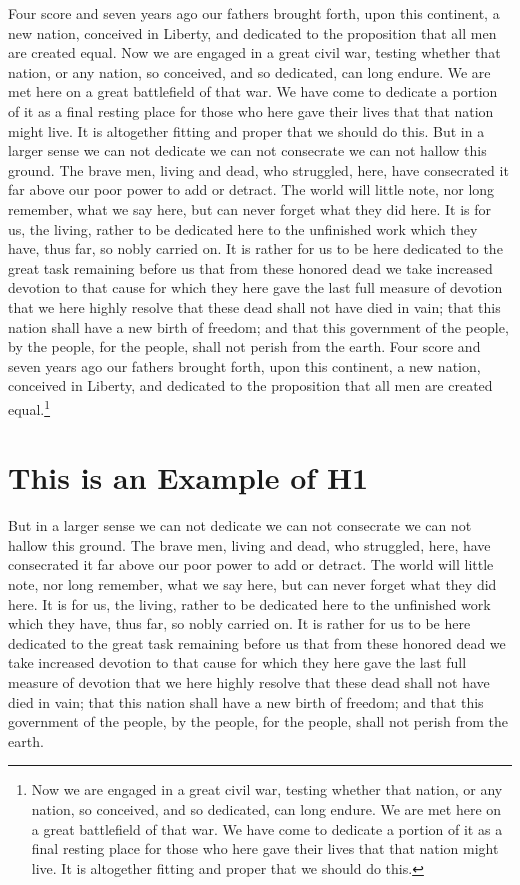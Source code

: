 \documentclass{roffin}
\begin{document}
Four score and seven years ago our fathers brought forth,
upon this continent, a new nation, conceived in Liberty, and dedicated to
the proposition that all men are created equal.
Now we are engaged in a great civil war, testing whether that nation, or any nation, so conceived, and so dedicated, can long endure.
We are met here on a great battlefield of that war. We have come to dedicate a portion of it as a final resting place for those who
here gave their lives that that nation might live. It is altogether fitting and proper that we should do this.
But in a larger sense we can not dedicate we can not consecrate we can not hallow this ground. The brave men, living and dead,
who struggled, here, have consecrated it far above our poor power to add or detract. The world will little note, nor long remember,
what we say here, but can never forget what they did here. It is for us, the living, rather to be dedicated here to the unfinished work
which they have, thus far, so nobly carried on. It is rather for us to be here dedicated to the great task remaining before us that
from these honored dead we take increased devotion to that cause for which they here gave the last full measure of devotion that
we here highly resolve that these dead shall not have died in vain; that this nation shall have a new birth of freedom; and that this
government of the people, by the people, for the people, shall not perish from the earth.
Four score and seven years ago our fathers brought forth,
upon this continent, a new nation, conceived in Liberty, and dedicated to
the proposition that all men are created equal.\footnote{Now we are engaged in a great civil war, testing whether that nation, or any nation, so conceived, and so dedicated, can long endure.
We are met here on a great battlefield of that war. We have come to dedicate a portion of it as a final resting place for those who
here gave their lives that that nation might live. It is altogether fitting and proper that we should do this.}

\section{This is an Example of H1}

But in a larger sense we can not dedicate we can not consecrate we can not hallow this ground. The brave men, living and dead,
who struggled, here, have consecrated it far above our poor power to add or detract. The world will little note, nor long remember,
what we say here, but can never forget what they did here. It is for us, the living, rather to be dedicated here to the unfinished work
which they have, thus far, so nobly carried on. It is rather for us to be here dedicated to the great task remaining before us that
from these honored dead we take increased devotion to that cause for which they here gave the last full measure of devotion that
we here highly resolve that these dead shall not have died in vain; that this nation shall have a new birth of freedom; and that this
government of the people, by the people, for the people, shall not perish from the earth.
\end{document}
